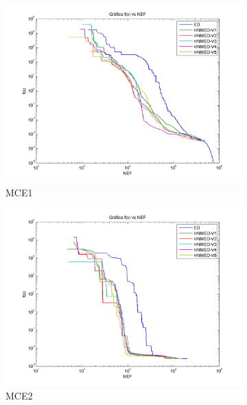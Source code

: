 \begin{figure}
	\centering
	\begin{subfigure}[b]{0.49\linewidth}
		\includegraphics[width=\linewidth]{Figures/C-Grafica_Convergencia_Problema_1}
		\caption{MCE1} \label{fig:M1} 
	\end{subfigure}
	\begin{subfigure}[b]{0.49\linewidth}
		\includegraphics[width=\textwidth]{Figures/C-Grafica_Convergencia_Problema_2}
		\caption{MCE2} \label{fig:M2} 
	\end{subfigure}
	\begin{subfigure}[b]{0.49\linewidth}

\end{subfigure}
\end{figure}
